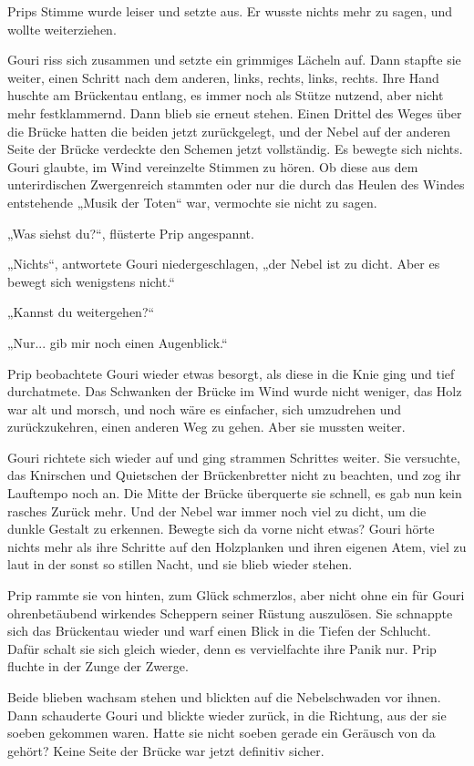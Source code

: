 \documentclass[10pt, a4paper, oneside]{book}
\begin{document}
Prips Stimme wurde leiser und setzte aus. Er wusste nichts mehr zu sagen, und wollte weiterziehen.

Gouri riss sich zusammen und setzte ein grimmiges Lächeln auf. Dann stapfte sie weiter, einen Schritt nach dem anderen, links, rechts, links, rechts. Ihre Hand huschte am Brückentau entlang, es immer noch als Stütze nutzend, aber nicht mehr festklammernd. Dann blieb sie erneut stehen. Einen Drittel des Weges über die Brücke hatten die beiden jetzt zurückgelegt, und der Nebel auf der anderen Seite der Brücke verdeckte den Schemen jetzt vollständig. Es bewegte sich nichts. Gouri glaubte, im Wind vereinzelte Stimmen zu hören. Ob diese aus dem unterirdischen Zwergenreich stammten oder nur die durch das Heulen des Windes entstehende „Musik der Toten“ war, vermochte sie nicht zu sagen.

„Was siehst du?“, flüsterte Prip angespannt.

„Nichts“, antwortete Gouri niedergeschlagen, „der Nebel ist zu dicht. Aber es bewegt sich wenigstens nicht.“

„Kannst du weitergehen?“

„Nur... gib mir noch einen Augenblick.“

Prip beobachtete Gouri wieder etwas besorgt, als diese in die Knie ging und tief durchatmete. Das Schwanken der Brücke im Wind wurde nicht weniger, das Holz war alt und morsch, und noch wäre es einfacher, sich umzudrehen und zurückzukehren, einen anderen Weg zu gehen. Aber sie mussten weiter.

Gouri richtete sich wieder auf und ging strammen Schrittes weiter. Sie versuchte, das Knirschen und Quietschen der Brückenbretter nicht zu beachten, und zog ihr Lauftempo noch an. Die Mitte der Brücke überquerte sie schnell, es gab nun kein rasches Zurück mehr. Und der Nebel war immer noch viel zu dicht, um die dunkle Gestalt zu erkennen. Bewegte sich da vorne nicht etwas? Gouri hörte nichts mehr als ihre Schritte auf den Holzplanken und ihren eigenen Atem, viel zu laut in der sonst so stillen Nacht, und sie blieb wieder stehen.

Prip rammte sie von hinten, zum Glück schmerzlos, aber nicht ohne ein für Gouri ohrenbetäubend wirkendes Scheppern seiner Rüstung auszulösen. Sie schnappte sich das Brückentau wieder und warf einen Blick in die Tiefen der Schlucht. Dafür schalt sie sich gleich wieder, denn es vervielfachte ihre Panik nur. Prip fluchte in der Zunge der Zwerge.

Beide blieben wachsam stehen und blickten auf die Nebelschwaden vor ihnen. Dann schauderte Gouri und blickte wieder zurück, in die Richtung, aus der sie soeben gekommen waren. Hatte sie nicht soeben gerade ein Geräusch von da gehört? Keine Seite der Brücke war jetzt definitiv sicher.
\end{document}
